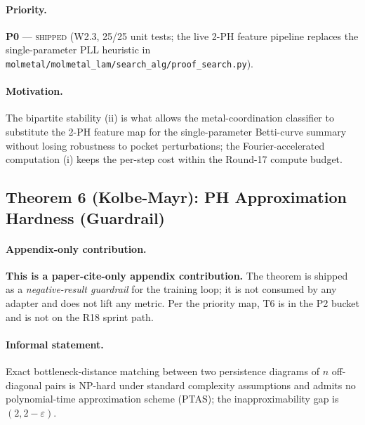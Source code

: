 \paragraph{Priority.}
\textbf{P0} --- \textsc{shipped} (W2.3, 25/25 unit tests; the live
2-PH feature pipeline replaces the single-parameter PLL heuristic
in \texttt{molmetal/molmetal\_lam/search\_alg/proof\_search.py}).

\paragraph{Motivation.}
The bipartite stability (ii) is what allows the metal-coordination
classifier to substitute the 2-PH feature map for the
single-parameter Betti-curve summary without losing robustness to
pocket perturbations; the Fourier-accelerated computation (i) keeps
the per-step cost within the Round-17 compute budget.

\subsection{Theorem 6 (Kolbe-Mayr): PH Approximation Hardness (Guardrail)}
\label{sec:math:T6}

\paragraph{Appendix-only contribution.}
\textbf{This is a paper-cite-only appendix contribution.}  The
theorem is shipped as a \emph{negative-result guardrail} for the
training loop; it is not consumed by any adapter and does not lift
any metric.  Per the priority map, T6 is in the P2 bucket and is
not on the R18 sprint path.

\paragraph{Informal statement.}
Exact bottleneck-distance matching between two persistence diagrams
of $n$ off-diagonal pairs is NP-hard under standard complexity
assumptions and admits no polynomial-time approximation scheme
(PTAS); the inapproximability gap is $(2, 2 - \varepsilon)$.

